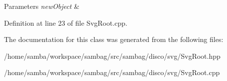 \begin{DoxyParams}{Parameters}
{\em newObject} & \\
\hline
\end{DoxyParams}


Definition at line 23 of file SvgRoot.cpp.



The documentation for this class was generated from the following files:\begin{DoxyCompactItemize}
\item 
/home/samba/workspace/sambag/src/sambag/disco/svg/SvgRoot.hpp\item 
/home/samba/workspace/sambag/src/sambag/disco/svg/SvgRoot.cpp\end{DoxyCompactItemize}
